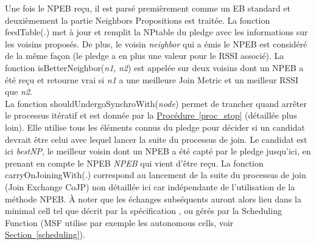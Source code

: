 \documentclass[]{report}
\newcommand{\wordlink}[2]{\hyperref[#2]{#1~\ref{#2}}}
\begin{document}
Une fois le NPEB reçu, il est parsé premièrement comme un EB standard et deuxièmement la partie Neighbors Propositions est traitée. La fonction feedTable(.) met à jour et remplit la NPtable du pledge avec les informations sur les voisins proposés. De plus, le voisin \textit{neighbor} qui a émis le NPEB est considéré de la même façon (le pledge a en plus une valeur pour le RSSI associé). La fonction isBetterNeighbor(\textit{n1}, \textit{n2}) est appelée sur deux voisins dont un NPEB a été reçu et retourne vrai si \textit{n1} a une meilleure Join Metric et un meilleur RSSI que \textit{n2}.\\

La fonction shouldUndergoSynchroWith(\textit{node}) permet de trancher quand arrêter le processus itératif et est donnée par la \wordlink{Procédure}{proc_stop} (détaillée plus loin). Elle utilise tous les éléments connus du pledge pour décider si un candidat devrait être celui avec lequel lancer la suite du processus de join. Le candidat est ici \textit{bestNP}, le meilleur voisin dont un NPEB a été capté par le pledge jusqu'ici, en prenant en compte le NPEB \textit{NPEB} qui vient d'être reçu. La fonction carryOnJoiningWith(.) correspond au lancement de la suite du processus de join (Join Exchange CoJP) non détaillée ici car indépendante de l'utilisation de la méthode NPEB. À noter que les échanges subséquents auront alors lieu dans la minimal cell tel que décrit par la spécification \cite{rfc8180}, ou gérés par la Scheduling Function (MSF utilise par exemple les autonomous cells, voir \wordlink{Section}{scheduling}).\\

\newpage
\end{document}
